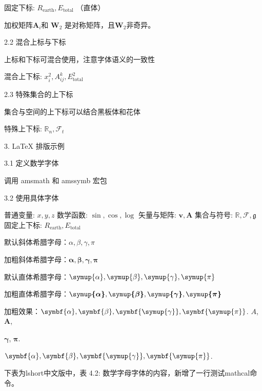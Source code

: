 \documentclass{article}
\begin{document}
固定下标: $R_\mathrm{earth}, E_\text{total}$ （直体）

加权矩阵$\symbf{A}_{i}$和 ${{\boldsymbol{W}}_{2}}$ 是对称矩阵，且$ {{\boldsymbol{W}}_{2}}$非奇异。	\label{assum_dca1}

2.2 混合上标与下标

上标和下标可混合使用，注意字体语义的一致性

混合上下标: $x_i^2, A_{ij}^k, E_\mathrm{total}^2$

2.3 特殊集合的上下标

集合与空间的上下标可以结合黑板体和花体

特殊上下标: $\mathbb{R}_n, \mathcal{F}_t$


3. LaTeX 排版示例

3.1 定义数学字体

调用 amsmath 和 amssymb 宏包

3.2 使用具体字体

普通变量: $x, y, z$
数学函数: $\sin, \cos, \log$
矢量与矩阵: $\boldsymbol{v}, \boldsymbol{A}$
集合与符号: $\mathbb{R}, \mathcal{F}, \mathfrak{g}$
固定上下标: $R_\mathrm{earth}, E_\text{total}$





默认斜体希腊字母：$\alpha, \beta, \gamma, \pi$

加粗斜体希腊字母：$\boldsymbol{\alpha}, \boldsymbol{\beta}, \boldsymbol{\gamma}, \boldsymbol{\pi}$

默认直体希腊字母：$\symup{\alpha}, \symup{\beta}, \symup{\gamma}, \symup{\pi}$

加粗直体希腊字母：$\boldsymbol{\symup{\alpha}}, \boldsymbol{\symup{\beta}}, \boldsymbol{\symup{\gamma}}, \boldsymbol{\symup{\pi}}$

加粗效果：$\symbf{{\alpha}}, \symbf{{\beta}}, \symbf{\symup{\gamma}}, \symbf{\symup{\pi}}$. $A$,$\symbf{A}$, 

${\mathbf{\gamma}}$, ${\mathbf{\pi}}$. %

$\symbf{{\alpha}}, \symbf{{\beta}}, \symbf{\symup{\gamma}}, \symbf{\symup{\pi}}$.

下表为lshort中文版中，表 4.2: 数学字母字体的内容，新增了一行测试mathcal命令。
\end{document}
